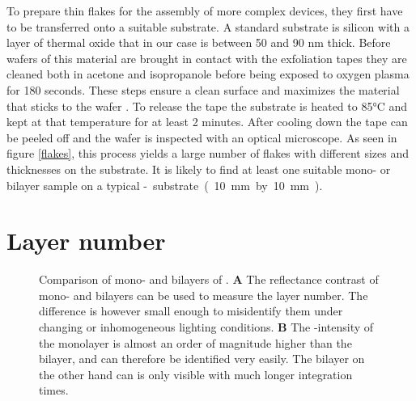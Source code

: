 To prepare thin \tmdg flakes for the assembly of more complex devices, they first have to be transferred onto a suitable substrate. A standard substrate is silicon with a layer of thermal oxide that in our case is between 50 and 90 nm thick. Before wafers of this material are brought in contact with the exfoliation tapes they are cleaned both in acetone and isopropanole before being exposed to oxygen plasma for 180 seconds. These steps ensure a clean surface and maximizes the material that sticks to the wafer \cite{pizzocchero_hot_2016}. To release the tape the substrate is heated to 85°C and kept at that temperature for at least 2 minutes. After cooling down the tape can be peeled off and the wafer is inspected with an optical microscope. As seen in figure \ref{flakes}, this process yields a large number of flakes with different sizes and thicknesses on the substrate. It is likely to find at least one suitable mono- or bilayer sample on a typical \si-substrate (10 mm by 10 mm). 

\section{Layer number}

\begin{figure}
	\centering
	\begin{subfigure}{0.4\textwidth}
	\caption{}
	\end{subfigure}
	\begin{subfigure}{0.4\textwidth}
	\caption{}
	\end{subfigure}
	\caption{Comparison of mono- and bilayers of \wse\!. \textbf{A} The reflectance contrast of mono- and bilayers can be used to measure the layer number. The difference is however small enough to misidentify them under changing or inhomogeneous lighting conditions. \textbf{B} The \pl-intensity of the monolayer is almost an order of magnitude higher than the bilayer, and can therefore be identified very easily. The bilayer on the other hand can is only visible with much longer integration times.}
	\label{pl-contrast}
\end{figure}

